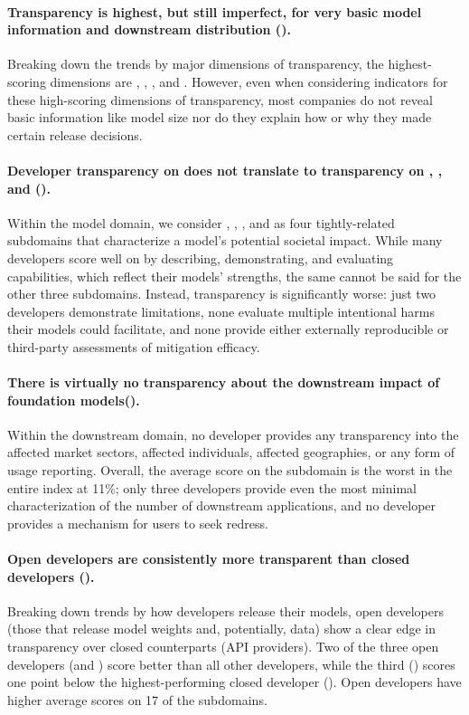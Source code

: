 \documentclass[screen, authorversion, acmsmall]{acmart}
\begin{document}
\paragraph{Transparency is highest, but still imperfect, for very basic model information and downstream distribution ().}
Breaking down the trends by major dimensions of transparency, the highest-scoring dimensions are \methods, \modelbasics, \capabilities, and \distribution.
However, even when considering indicators for these high-scoring dimensions of transparency, most companies do not reveal basic information like model size nor do they explain how or why they made certain release decisions. 

\paragraph{Developer transparency on \capabilities does not translate to transparency on \limitations, \risks, and \modelmitigations ().}
Within the model domain, we consider \capabilities, \limitations, \risks, and \modelmitigations as four tightly-related subdomains that characterize a model's potential societal impact.
While many developers score well on \capabilities by describing, demonstrating, and evaluating capabilities, which reflect their models' strengths, the same cannot be said for the other three subdomains.
Instead, transparency is significantly worse: just two developers demonstrate limitations, none evaluate multiple intentional harms their models could facilitate, and none provide either externally reproducible or third-party assessments of mitigation efficacy.

\paragraph{There is virtually no transparency about the downstream impact of foundation models().}
Within the downstream domain, no developer provides any transparency into the affected market sectors, affected individuals, affected geographies, or any form of usage reporting.
Overall, the average score on the \impact subdomain is the worst in the entire index at 11\%; only three developers provide even the most minimal characterization of the number of downstream applications, and no developer provides a mechanism for users to seek redress.

\paragraph{Open developers are consistently more transparent than closed developers ().}
Breaking down trends by how developers release their models, open developers (\ie those that release model weights and, potentially, data) show a clear edge in transparency over closed counterparts (\eg API providers). 
Two of the three open developers (\meta and \huggingface) score better than all other developers, while the third (\stability) scores one point below the highest-performing closed developer (\openai). Open developers have higher average scores on 17 of the \numsubdomains subdomains. 
\end{document}
